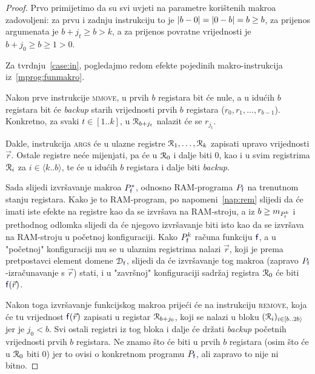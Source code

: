 \begin{proof}
Prvo primijetimo da su svi uvjeti na parametre korištenih makroa zadovoljeni: za prvu i zadnju instrukciju to je $\lvert b-0\rvert=\lvert0-b\rvert=b\ge b$, za prijenos argumenata je $b+j_t\ge b>k$, a za prijenos povratne vrijednosti je $b+j_0\ge b\ge 1>0$.

Za tvrdnju~\ref{case:in}, pogledajmo redom efekte pojedinih makro-instrukcija iz~\eqref{mprog:funmakro}.

Nakon prve instrukcije \textsc{mmove}, u prvih $b$ registara bit će nule, a u idućih $b$ registara bit će \emph{backup} starih vrijednosti prvih $b$ registara ($r_0,r_1,\dotsc,r_{b-1}$). Konkretno, za svaki $t\in[1..k]$, u $\mathcal R_{b+j_t}$ nalazit će se $r_{j_t}$.

Dakle, instrukcija \textsc{args} će u ulazne registre $\mathcal R_{1},\dotsc,\mathcal R_{k}$ zapisati upravo vrijednosti $\vec r$. Ostale registre neće mijenjati, pa će u $\mathcal R_{0}$ i dalje biti $0$, kao i u svim registrima $\mathcal R_{i}$ za $i\in\langle k..b\rangle$, te će u idućih $b$ registara i dalje biti \emph{backup}.

Sada slijedi izvršavanje makroa $P_{\f{f}}^*$, odnosno RAM-programa $P_{\f{f}}$ na trenutnom stanju registara. Kako je to RAM-program, po napomeni~\ref{nap:rem} slijedi da će imati iste efekte na registre kao da se izvršava na RAM-stroju, a iz $b\ge m_{P_{\f{f}}^k}$ i prethodnog odlomka slijedi da će njegovo izvršavanje biti isto kao da se izvršava na  RAM-stroju u početnoj konfiguraciji. Kako $P_{\f{f}}^k$ računa funkciju $\f{f}$, a u "početnoj" konfiguraciji mu se u ulaznim registrima nalazi $\vec r$, koji je prema pretpostavci element domene $\dom{\f{f}}$, slijedi da će izvršavanje tog makroa  (zapravo $P_{\f{f}}$-izračunavanje s $\vec r$) stati, i u "završnoj" konfiguraciji sadržaj registra $\mathcal R_{0}$ će biti $\f{f}(\vec r)$.

Nakon toga izvršavanje funkcijskog makroa prijeći će na instrukciju \textsc{remove}, koja će tu vrijednost $\f{f}(\vec r)$ zapisati u registar $\mathcal R_{b+j_0}$, koji se nalazi u bloku $(\mathcal R_{i})_{i\in[b..2b\rangle}$ jer je $j_0<b$. Svi ostali registri iz tog bloka i dalje će držati \emph{backup} početnih vrijednosti prvih $b$ registara. Ne znamo što će biti u prvih $b$ registara (osim što će u $\mathcal R_{0}$ biti $0$) jer to ovisi o konkretnom programu $P_{\f{f}}$, ali zapravo to nije ni bitno.


\end{proof}
